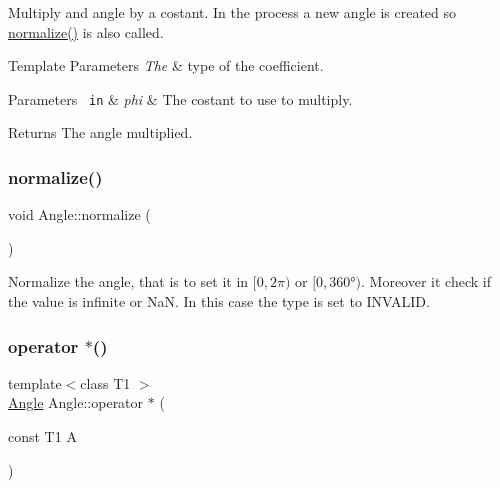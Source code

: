 Multiply and angle by a costant. In the process a new angle is created so {\ttfamily \mbox{\hyperlink{class_angle_a449fc0638ca2e26b4a57d1cce95788e8}{normalize()}}} is also called. 


\begin{DoxyTemplParams}{Template Parameters}
{\em The} & type of the coefficient. \\
\hline
\end{DoxyTemplParams}

\begin{DoxyParams}[1]{Parameters}
\mbox{\texttt{ in}}  & {\em phi} & The costant to use to multiply. \\
\hline
\end{DoxyParams}
\begin{DoxyReturn}{Returns}
The angle multiplied. 
\end{DoxyReturn}
\mbox{\label{class_angle_a449fc0638ca2e26b4a57d1cce95788e8}} 
\subsubsection{\texorpdfstring{normalize()}{normalize()}}
{\footnotesize\ttfamily void Angle\+::normalize (\begin{DoxyParamCaption}{ }\end{DoxyParamCaption})\hspace{0.3cm}{\ttfamily [inline]}}



Normalize the angle, that is to set it in $[0, 2\pi)$ or $[0, 360°)$. Moreover it check if the value is infinite or NaN. In this case the {\ttfamily type} is set to {\ttfamily I\+N\+V\+A\+L\+ID}. 

\mbox{\label{class_angle_ab50d514ec9f24c0b65d37f174cbff780}} 
\subsubsection{\texorpdfstring{operator $\ast$()}{operator *()}}
{\footnotesize\ttfamily template$<$class T1 $>$ \\
\mbox{\hyperlink{class_angle}{Angle}} Angle\+::operator $\ast$ (\begin{DoxyParamCaption}\item[{const T1}]{A }\end{DoxyParamCaption})\hspace{0.3cm}{\ttfamily [inline]}}

